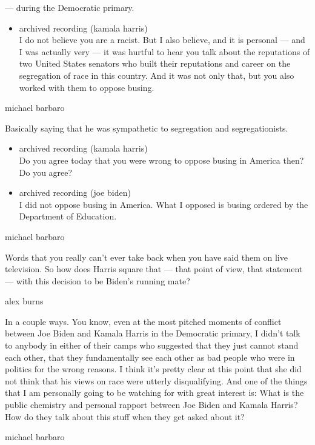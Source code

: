 --- during the Democratic primary.

\begin{itemize}
\tightlist
\item
  archived recording (kamala harris)\\
  I do not believe you are a racist. But I also believe, and it is
  personal --- and I was actually very --- it was hurtful to hear you
  talk about the reputations of two United States senators who built
  their reputations and career on the segregation of race in this
  country. And it was not only that, but you also worked with them to
  oppose busing.
\end{itemize}

michael barbaro

Basically saying that he was sympathetic to segregation and
segregationists.

\begin{itemize}
\item
  archived recording (kamala harris)\\
  Do you agree today that you were wrong to oppose busing in America
  then? Do you agree?
\item
  archived recording (joe biden)\\
  I did not oppose busing in America. What I opposed is busing ordered
  by the Department of Education.
\end{itemize}

michael barbaro

Words that you really can't ever take back when you have said them on
live television. So how does Harris square that --- that point of view,
that statement --- with this decision to be Biden's running mate?

alex burns

In a couple ways. You know, even at the most pitched moments of conflict
between Joe Biden and Kamala Harris in the Democratic primary, I didn't
talk to anybody in either of their camps who suggested that they just
cannot stand each other, that they fundamentally see each other as bad
people who were in politics for the wrong reasons. I think it's pretty
clear at this point that she did not think that his views on race were
utterly disqualifying. And one of the things that I am personally going
to be watching for with great interest is: What is the public chemistry
and personal rapport between Joe Biden and Kamala Harris? How do they
talk about this stuff when they get asked about it?

michael barbaro

